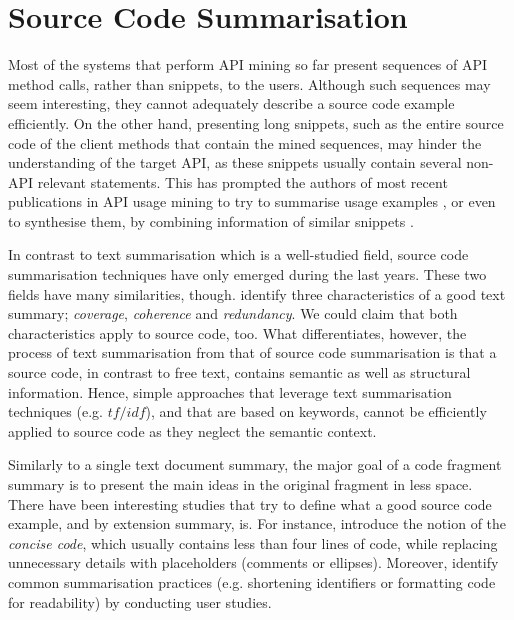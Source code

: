 \section{Source Code Summarisation}
\label{sec:source-code-summarisation}

Most of the systems that perform API mining so far present sequences of API method calls, rather than snippets, to the users. Although such sequences may seem interesting, they cannot adequately describe a source code example efficiently. On the other hand, presenting long snippets, such as the entire source code of the client methods that contain the mined sequences, may hinder the understanding of the target API, as these snippets usually contain several non-API relevant statements. This has prompted the authors of most recent publications in API usage mining to try to summarise usage examples \cite{Montandon:2013, Kim:2013}, or even to synthesise them, by combining information of similar snippets \cite{Buse:2012}.

In contrast to text summarisation which is a well-studied field, source code summarisation techniques have only emerged during the last years. These two fields have many similarities, though.  \cite{Ramanujam:2016} identify three characteristics of a good text summary; \textit{coverage}, \textit{coherence} and \textit{redundancy}. We could claim that both characteristics apply to source code, too. What differentiates, however, the process of text summarisation from that of source code summarisation is that a source code, in contrast to free text, contains semantic as well as structural information. Hence, simple approaches that leverage text summarisation techniques (e.g. $tf/idf$), and that are based on keywords, cannot be efficiently applied to source code as they neglect the semantic context.

Similarly to a single text document summary, the major goal of a code fragment summary is to present the main ideas in the original fragment in less space. There have been interesting studies that try to define what a good source code example, and by extension summary, is. For instance,  \cite{Nasehi:2012} introduce the notion of the \textit{concise code}, which usually contains less than four lines of code, while replacing unnecessary details with placeholders (comments or ellipses). Moreover,  \cite{Ying:2014} identify common summarisation practices (e.g. shortening identifiers or formatting code for readability) by  conducting user studies.


